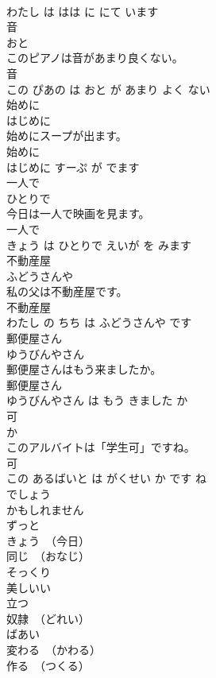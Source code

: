 \documentclass[8pt]{extreport}
\begin{document}
\begin{CJK}{UTF8}{min}
\\	わたし は はは に にて います			
\\	音	
\\	おと			
\\	このピアノは音があまり良くない。	
\\	音 
\\	この ぴあの は おと が あまり よく ない			
\\	始めに	
\\	はじめに			
\\	始めにスープが出ます。	
\\	始めに 
\\	はじめに すーぷ が でます			
\\	一人で	
\\	ひとりで			
\\	今日は一人で映画を見ます。	
\\	一人で 
\\	きょう は ひとりで えいが を みます			
\\	不動産屋	
\\	ふどうさんや			
\\	私の父は不動産屋です。	
\\	不動産屋 
\\	わたし の ちち は ふどうさんや です			
\\	郵便屋さん	
\\	ゆうびんやさん			
\\	郵便屋さんはもう来ましたか。	
\\	郵便屋さん 
\\	ゆうびんやさん は もう きました か			
\\	可	
\\	か			
\\	このアルバイトは「学生可」ですね。	
\\	可 
\\	この あるばいと は がくせい か です ね			
\\	でしょう	
\\	かもしれません	
\\	ずっと	
\\	きょう　（今日）	
\\	同じ　（おなじ）	
\\	そっくり	
\\	美しいい	
\\	立つ	
\\	奴隷　（どれい）	
\\	ばあい	
\\	変わる　（かわる）	
\\	作る　（つくる）	

\end{CJK}
\end{document}
